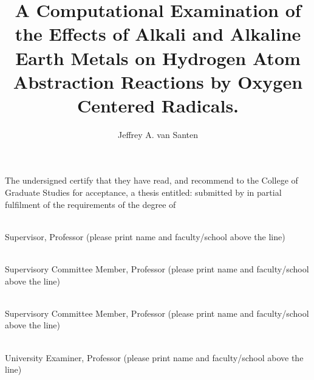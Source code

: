 \documentclass[msc,oneside]{ubcthesis}%
\title{A Computational Examination of the Effects of Alkali and
  Alkaline Earth Metals on Hydrogen Atom Abstraction Reactions by
  Oxygen Centered Radicals.}
\author{Jeffrey A. van Santen} %
\begin{document}
\frontmatter                    %

\maketitle                      %

\makeatletter

The undersigned certify that they have read, and recommend to the
College of Graduate Studies for acceptance, a thesis entitled: {\sc
  \@title } submitted by {\sc \@author} in partial fulfilment of the
requirements of the degree of \@degreetitle \makeatother

\newlength{\linespace}
\setlength{\linespace}{.75cm} %
\vspace{\linespace}\smaller

\noindent\underline{\hspace{30em}} \\
Supervisor, Professor (please print name and faculty/school above the line)

\vspace{\linespace}

\noindent\underline{\hspace{30em}} \\
Supervisory Committee Member, Professor (please print name and faculty/school above the line)

\vspace{\linespace}

\noindent\underline{\hspace{30em}} \\
Supervisory Committee Member, Professor (please print name and faculty/school above the line)

\vspace{\linespace}

\noindent\underline{\hspace{30em}} \\
University Examiner, Professor (please print name and faculty/school above the line)
\end{document}
